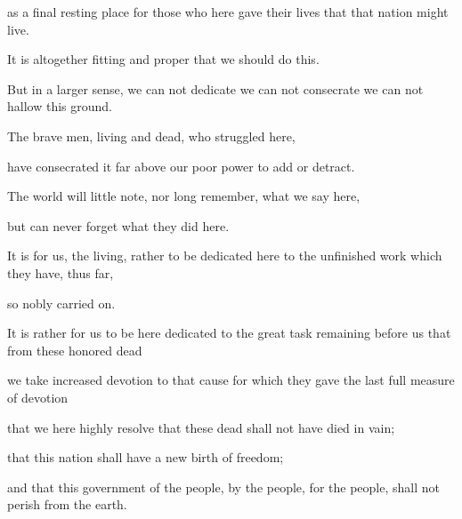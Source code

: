 \documentclass{article}
\begin{document}
as a final resting place for those who here gave their lives that that nation might live. 

It is altogether fitting and proper that we should do this.

But in a larger sense, we can not dedicate we can not consecrate we can not hallow this ground. 

The brave men, living and dead, who struggled here, 

have consecrated it far above our poor power to add or detract. 

The world will little note, nor long remember, what we say here, 

but can never forget what they did here.

It is for us, the living, rather to be dedicated here to the unfinished work which they have, thus far, 

so nobly carried on. 



It is rather for us to be here dedicated to the great task remaining before us that from these honored dead 

we take increased devotion to that cause for which they gave the last full measure of devotion 

that we here highly resolve that these dead shall not have died in vain; 

that this nation shall have a new birth of freedom; 

and that this government of the people, by the people, for the people, shall not perish from the earth.
\end{document}
